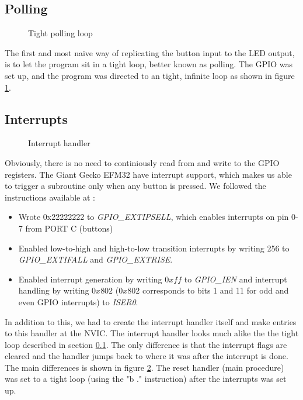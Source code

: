 	\subsection{Polling}
	\label{subsection:polling}
	\begin{figure}[t]
		
		\caption{Tight polling loop}
		\label{code:polling_loop}
	\end{figure}
	The first and most naïve way of replicating the button input to the LED output, is to let the program sit in a tight loop, better known as polling. The GPIO was set up, and the program was directed to an tight, infinite loop as shown in figure \ref{code:polling_loop}.

	\subsection{Interrupts}
	\label{subsection:interrupts}
	\begin{figure}[t]
		
		\caption{Interrupt handler}
		\label{code:interrupt_handler}
	\end{figure}
	Obviously, there is no need to continiously read from and write to the GPIO registers. The Giant Gecko EFM32 have interrupt support, which makes us able to trigger a subroutine only when any button is pressed. We followed the instructions available at \cite[p. 24]{compendium}:
	\begin{itemize}
		\item Wrote 0x22222222 to \emph{GPIO\_EXTIPSELL}, which enables interrupts on pin 0-7 from PORT C (buttons) \cite[p. 770]{reference_manual}
		\item Enabled low-to-high and high-to-low transition interrupts by writing 256 to \emph{GPIO\_EXTIFALL} and \emph{GPIO\_EXTRISE}.
		\item Enabled interrupt generation by writing $0xff$ to \emph{GPIO\_IEN} and interrupt handling by writing $0x802$ ($0x802$ corresponds to bits 1 and 11 for odd and even GPIO interrupts) to \emph{ISER0}.
	\end{itemize}
	
	


In addition to this, we had to create the interrupt handler itself and make entries to this handler at the NVIC. The interrupt handler looks much alike the the tight loop described in section \ref{subsection:polling}. The only difference is that the interrupt flags are cleared and the handler jumps back to where it was after the interrupt is done. The main differences is shown in figure \ref{code:interrupt_handler}. The reset handler (main procedure) was set to a tight loop (using the "b ." instruction) after the interrupts was set up.

